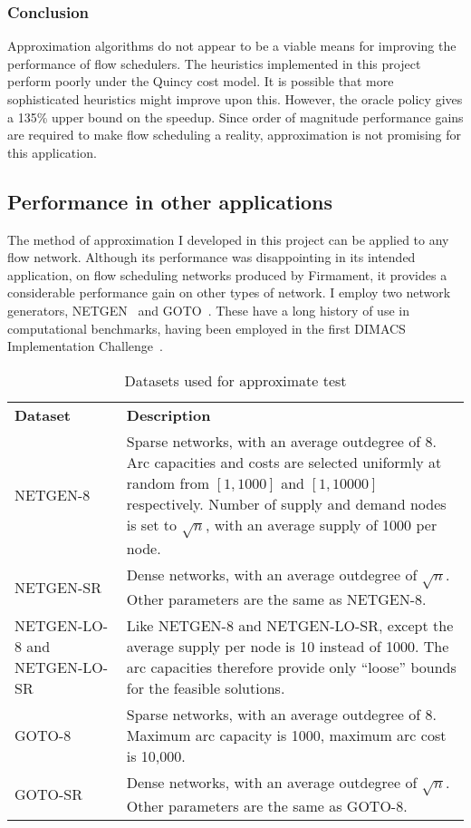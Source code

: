 \subsubsection{Conclusion}

Approximation algorithms do not appear to be a viable means for improving the performance of flow schedulers. The heuristics implemented in this project perform poorly under the Quincy cost model. It is possible that more sophisticated heuristics might improve upon this. However, the oracle policy gives a 135\% upper bound on the speedup. Since order of magnitude performance gains are required to make flow scheduling a reality, approximation is not promising for this application.

\subsection{Performance in other applications}

The method of approximation I developed in this project can be applied to any flow network. Although its performance was disappointing in its intended application, on flow scheduling networks produced by Firmament, it provides a considerable performance gain on other types of network. I employ two network generators, NETGEN~\cite{Klingman:1974} and GOTO~\cite{GoldbergDIMACS:1993}. These have a long history of use in computational benchmarks, having been employed in the first DIMACS Implementation Challenge~\cite{DIMACSChallenge:Book}.

\begin{table}
    \centering
    \setlength{\tabcolsep}{1.5em}
    \begin{tabular}{p{}p{}}
        \textbf{Dataset} & \textbf{Description} \tabularnewline
        NETGEN-8 & Sparse networks, with an average outdegree of $8$. Arc capacities and costs are selected uniformly at random from $\left[1,1000\right]$ and $\left[1,10000\right]$ respectively. Number of supply and demand nodes is set to $\sqrt{n}$, with an average supply of 1000 per node. \tabularnewline
        NETGEN-SR & Dense networks, with an average outdegree of $\sqrt{n}$. Other parameters are the same as NETGEN-8. \tabularnewline
        NETGEN-LO-8 and NETGEN-LO-SR & Like NETGEN-8 and NETGEN-LO-SR, except the average supply per node is 10 instead of 1000. The arc capacities therefore provide only ``loose'' bounds for the feasible solutions. \tabularnewline
        GOTO-8 & Sparse networks, with an average outdegree of $8$. Maximum arc capacity is 1000, maximum arc cost is 10,000. \tabularnewline
        GOTO-SR & Dense networks, with an average outdegree of $\sqrt{n}$. Other parameters are the same as GOTO-8. \tabularnewline
    \end{tabular}
    \caption{Datasets used for approximate test}
    \label{table:general-datasets}
\end{table}

